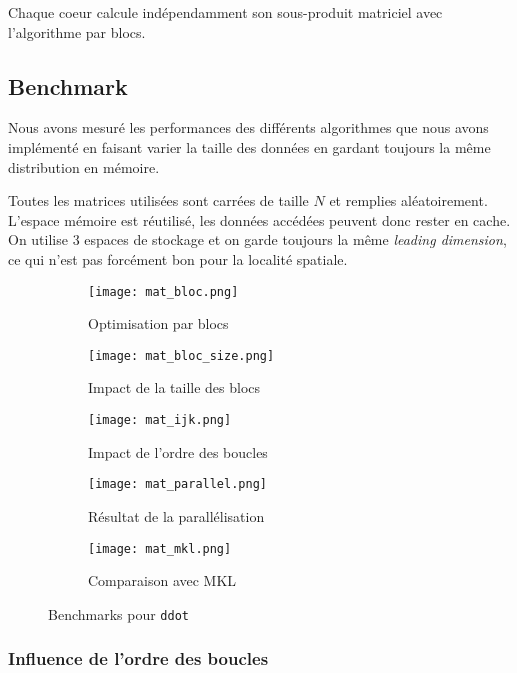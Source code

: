 Chaque coeur calcule indépendamment son sous-produit matriciel avec l'algorithme par blocs.

\subsection{Benchmark}

Nous avons mesuré les performances des différents algorithmes que nous avons implémenté en faisant varier la taille des données en gardant toujours la même distribution en mémoire.

Toutes les matrices utilisées sont carrées de taille $N$ et remplies aléatoirement. L'espace mémoire est réutilisé, les données accédées peuvent donc rester en cache. On utilise 3 espaces de stockage et on garde toujours la même \emph{leading dimension}, ce qui n'est pas forcément bon pour la localité spatiale.

\begin{figure}[!ht]
\centering

\begin{subfigure}[b]{.5\textwidth}
  \centering
  \texttt{[image: mat\_bloc.png]}
  \caption{Optimisation par blocs}
  \label{fig:mat_bloc}
\end{subfigure}%
\begin{subfigure}[b]{.5\textwidth}
  \centering
  \texttt{[image: mat\_bloc\_size.png]}
  \caption{Impact de la taille des blocs}
  \label{fig:mat_bloc_size}
\end{subfigure}

\begin{subfigure}[b]{.5\textwidth}
  \centering
  \texttt{[image: mat\_ijk.png]}
  \caption{Impact de l'ordre des boucles}
  \label{fig:mat_ijk}
\end{subfigure}%
\begin{subfigure}[b]{.5\textwidth}
  \centering
  \texttt{[image: mat\_parallel.png]}
  \caption{Résultat de la parallélisation}
  \label{fig:mat_parallel}
\end{subfigure}
\begin{subfigure}[b]{.5\textwidth}
  \centering
  \texttt{[image: mat\_mkl.png]}
  \caption{Comparaison avec MKL}
  \label{fig:mat_mkl}
\end{subfigure}
\caption{Benchmarks pour \texttt{ddot}}
\label{fig:mat}
\end{figure}


\subsubsection{Influence de l'ordre des boucles}

